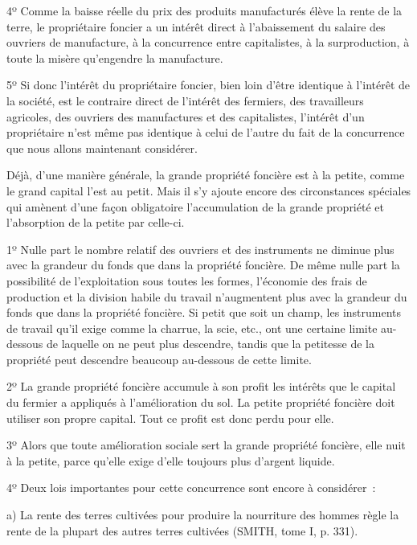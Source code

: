 \documentclass[french,twoside]{book} %
\newenvironment{quoteblock}%
  {\begin{quoting}}
  {\end{quoting}}
\newenvironment{quotebar}{%
    \def\FrameCommand{{\color{rubric!10!}\vrule width 0.5em} \hspace{0.9em}}%
    \def\OuterFrameSep{\itemsep} %
    \MakeFramed {\advance\hsize-\width \FrameRestore}
  }%
  {%
    \endMakeFramed
  }
\renewenvironment{quoteblock}%
  {%
    \savenotes
    \setstretch{0.9}
    \normalfont
    \begin{quotebar}
  }
  {%
    \end{quotebar}
    \spewnotes
  }
\begin{document}
4º Comme la baisse réelle du prix des produits manufacturés élève la rente de la terre, le propriétaire foncier a un intérêt direct à l’abaissement du salaire des ouvriers de manufacture, à la concurrence entre capitalistes, à la surproduction, à toute la misère qu’engendre la manufacture.\par
5º Si donc l’intérêt du propriétaire foncier, bien loin d’être identique à l’intérêt de la société, est le contraire direct de l’intérêt des fermiers, des travailleurs agricoles, des ouvriers des manufactures et des capitalistes, l’intérêt d’un propriétaire n’est même pas identique à celui de l’autre du fait de la concurrence que nous allons maintenant considérer.\par
Déjà, d’une manière générale, la grande propriété foncière est à la petite, comme le grand capital l’est au petit. Mais il s’y ajoute encore des circonstances spéciales qui amènent d’une façon obligatoire l’accumulation de la grande propriété et l’absorption de la petite par celle-ci.\par
[XII] 1º Nulle part le nombre relatif des ouvriers et des instruments ne diminue plus avec la grandeur du fonds que dans la propriété foncière. De même nulle part la possibilité de l’exploitation sous toutes les formes, l’économie des frais de production et la division habile du travail n’augmentent plus avec la grandeur du fonds que dans la propriété foncière. Si petit que soit un champ, les instruments de travail qu’il exige comme la charrue, la scie, etc., ont une certaine limite au-dessous de laquelle on ne peut plus descendre, tandis que la petitesse de la propriété peut descendre beaucoup au-dessous de cette limite.\par
2º La grande propriété foncière accumule à son profit les intérêts que le capital du fermier a appliqués à l’amélioration du sol. La petite propriété foncière doit utiliser son propre capital. Tout ce profit est donc perdu pour elle.\par
3º Alors que toute amélioration sociale sert la grande propriété foncière, elle nuit à la petite, parce qu’elle exige d’elle toujours plus d’argent liquide.\par
4º Deux lois importantes pour cette concurrence sont encore à considérer :\par

\begin{quoteblock}
 \noindent a) La rente des terres cultivées pour produire la nourriture des hommes règle la rente de la plupart des autres terres cultivées (SMITH, tome I, p. 331).
 \end{quoteblock}
\end{document}
